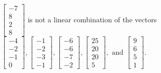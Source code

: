 \begin{exercise}
\begin{exerciseStatement}
  \end{exerciseStatement}
  \begin{exerciseAnswer}
   \(\left[\begin{array}{c}
-7 \\
8 \\
2 \\
8
\end{array}\right]\) 
  	 is not  
	a linear combination of the vectors \(\left[\begin{array}{c}
-4 \\
-2 \\
-1 \\
0
\end{array}\right] , \left[\begin{array}{c}
-1 \\
-2 \\
-3 \\
-1
\end{array}\right] , \left[\begin{array}{c}
-6 \\
-6 \\
-7 \\
-2
\end{array}\right] , \left[\begin{array}{c}
25 \\
20 \\
20 \\
5
\end{array}\right] , \text{ and } \left[\begin{array}{c}
9 \\
6 \\
5 \\
1
\end{array}\right]\).

	
  


  \end{exerciseAnswer}
\end{exercise}